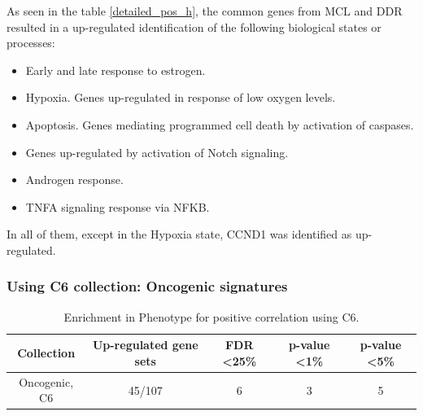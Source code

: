As seen in the table \ref{detailed_pos_h}, the common genes from MCL and DDR resulted in a up-regulated identification of the following biological states or processes:

\begin{itemize}
    \item Early and late response to estrogen.
    \item Hypoxia. Genes up-regulated in response of low oxygen levels.
    \item Apoptosis. Genes mediating programmed cell death by activation of caspases.
    \item Genes up-regulated by activation of Notch signaling.
    \item Androgen response.
    \item TNFA signaling response via NFKB.
\end{itemize}

In all of them, except in the Hypoxia state, CCND1 was identified as up-regulated.

\subsubsection{Using C6 collection: Oncogenic signatures}

\begin{table}[h!]
    \centering
    \begin{tabular}{ccccc}
    \hline
    Collection      & Up-regulated gene sets & FDR \textless 25\% & p-value \textless 1\% & p-value \textless 5\% \\ \hline
    Oncogenic, C6   & 45/107                 & 6                                 & 3                                    & 5                                    \\ \hline
    \end{tabular}
    \caption{Enrichment in Phenotype for positive correlation using C6.}
    \label{enr_ph_positive_c6}
    \end{table}

